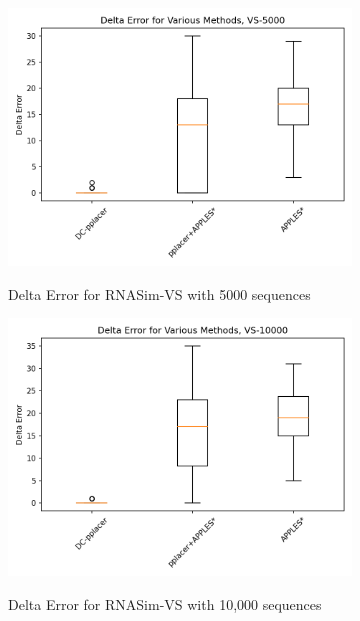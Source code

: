 \documentclass[10pt]{article}
\begin{document}
\begin{figure}[h]
\begin{subfigure}{0.5\textwidth}
\centering
\includegraphics[width=\textwidth]{Figs/VS-delta-error-5000.png}
\label{fig:error5000}
\caption{Delta Error for RNASim-VS with 5000 sequences}
\end{subfigure}
\begin{subfigure}{0.5\textwidth}
\centering
\includegraphics[width=\textwidth]{Figs/VS-delta-error-10000.png}
\label{fig:error10000}
\caption{Delta Error for RNASim-VS with 10,000 sequences}
\end{subfigure}\\
\begin{subfigure}{0.5\textwidth}
\centering

\end{subfigure}
\end{figure}
\end{document}
